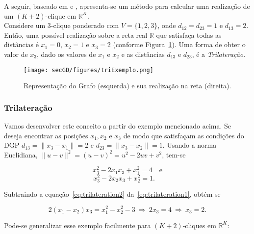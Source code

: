 A seguir, baseado em \cite{libertiEDG} e \cite{trilaterationDong}, apresenta-se um método para calcular uma realização de um $(K+2)$-clique em $\mathbb{R}^K$.
\\

Considere um 3-clique ponderado com $V = \{1,2,3\}$, onde $d_{12} = d_{23} = 1$ e $d_{13} = 2$. Então, uma possível realização sobre a reta real $\mathbb{R}$ que satisfaça todas as distâncias é $x_1 = 0$, $x_2 = 1$ e $x_3 = 2$ (conforme Figura~\ref{fig:triexemplo}). Uma forma de obter o valor de $x_3$, dado os valores de $x_1$ e $x_2$ e as distâncias $d_{13}$ e $d_{23}$, é a \textit{Trilateração}.

\begin{figure}[H]
	\begin{center}
		\texttt{[image: secGD/figures/triExemplo.png]}
	\end{center}
	\caption{Representação do Grafo (esquerda) e sua realização na reta (direita).}
	\label{fig:triexemplo}
\end{figure}

\subsubsection{Trilateração\label{sec:trilateration}}

 Vamos desenvolver este conceito a partir do exemplo mencionado acima. Se deseja encontrar as posições $x_1, x_2$ e $x_3$ de modo que satisfaçam as condições do DGP $d_{13} = \lVert x_3 - x_1\rVert = 2$ e $d_{23} = \lVert x_3 - x_2 \rVert = 1$. Usando a norma Euclidiana, $\lVert u-v\rVert^2 = (u-v)^2 = u^2 -2uv + v^2$, tem-se

\begin{equation}
	x_3^2 - 2x_1x_3 +x_1^2 = 4 \quad \textrm{e}
	\label{eq:trilateration1}
\end{equation}
\begin{equation}
x_3^2 - 2x_2x_3 +x_2^2 = 1. \quad
\label{eq:trilateration2}
\end{equation}

Subtraindo a equação~\ref{eq:trilateration2} da~\ref{eq:trilateration1}, obtém-se

\begin{equation*}
	2(x_1-x_2)x_3 = x_1^2 - x_2^2 - 3 \ \Rightarrow \ 2x_3 = 4 \ \Rightarrow \ x_3 = 2.
\end{equation*}

Pode-se generalizar esse exemplo facilmente para $(K+2)$-cliques em $\mathbb{R}^{K}$:
\\

